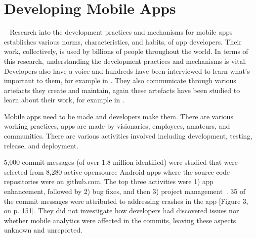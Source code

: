\section{Developing Mobile Apps}~\label{rw-developing-mobile-apps-section}
Research into the development practices and mechanisms for mobile apps establishes various norms, characteristics, and habits, of app developers. Their work, collectively, is used by billions of people throughout the world. In terms of this research, understanding the development practices and mechanisms is vital. Developers also have a voice and hundreds have been interviewed to learn what's important to them, for example in . They also communicate through various artefacts they create and maintain, again these artefacts have been studied to learn about their work, for example in .


Mobile apps need to be made and developers make them. There are various working practices, apps are made by visionaries, employees, amateurs, and communities. There are various activities involved including development, testing, release, and deployment. %


5,000 commit messages (of over 1.8 million identified) were studied that were selected from 8,280 active opensource Android apps where the source code repositories were on github.com. The top three activities were 1) app enhancement, followed by 2) bug fixes, and then 3) project management~. 35 of the commit messages were attributed to addressing crashes in the app [Figure 3, on p. 151]. They did not investigate how developers had discovered issues nor whether mobile analytics were affected in the commits, leaving these aspects unknown and unreported.

